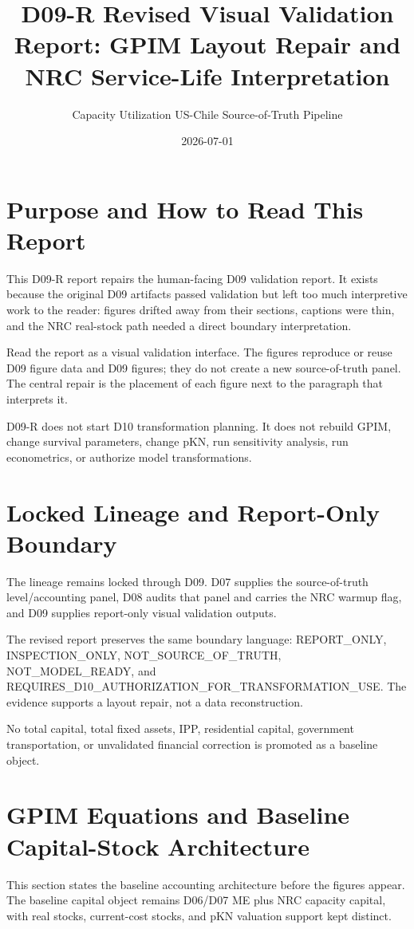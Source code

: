 \documentclass[11pt]{article}
\title{D09-R Revised Visual Validation Report: GPIM Layout Repair and NRC Service-Life Interpretation}
\author{Capacity Utilization US-Chile Source-of-Truth Pipeline}
\date{2026-07-01}
\begin{document}
\maketitle
\tableofcontents
\clearpage
\section{Purpose and How to Read This Report}
This D09-R report repairs the human-facing D09 validation report. It exists because the original D09 artifacts passed validation but left too much interpretive work to the reader: figures drifted away from their sections, captions were thin, and the NRC real-stock path needed a direct boundary interpretation.

Read the report as a visual validation interface. The figures reproduce or reuse D09 figure data and D09 figures; they do not create a new source-of-truth panel. The central repair is the placement of each figure next to the paragraph that interprets it.

D09-R does not start D10 transformation planning. It does not rebuild GPIM, change survival parameters, change pKN, run sensitivity analysis, run econometrics, or authorize model transformations.
\FloatBarrier
\section{Locked Lineage and Report-Only Boundary}
The lineage remains locked through D09. D07 supplies the source-of-truth level/accounting panel, D08 audits that panel and carries the NRC warmup flag, and D09 supplies report-only visual validation outputs.

The revised report preserves the same boundary language: REPORT\_ONLY, INSPECTION\_ONLY, NOT\_SOURCE\_OF\_TRUTH, NOT\_MODEL\_READY, and REQUIRES\_D10\_AUTHORIZATION\_FOR\_TRANSFORMATION\_USE. The evidence supports a layout repair, not a data reconstruction.

No total capital, total fixed assets, IPP, residential capital, government transportation, or unvalidated financial correction is promoted as a baseline object.
\FloatBarrier
\section{GPIM Equations and Baseline Capital-Stock Architecture}
This section states the baseline accounting architecture before the figures appear. The baseline capital object remains D06/D07 ME plus NRC capacity capital, with real stocks, current-cost stocks, and pKN valuation support kept distinct.
\end{document}
